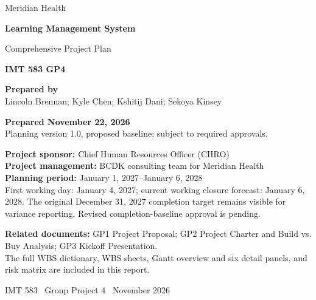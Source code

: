 \documentclass[11pt,letterpaper]{article}
\begin{document}
\thispagestyle{empty}
\vspace*{0.30in}

{\large\color{MeridianGray}Meridian Health\par}
\vspace{0.30in}
\begin{minipage}[t]{0.42\textwidth}
\RaggedRight
{\Huge\bfseries\color{MeridianPurple}Learning Management System\par}
\vspace{0.12in}
{\LARGE Comprehensive Project Plan\par}
\vspace{0.32in}

{\large\bfseries\color{MeridianPurple}IMT 583 GP4\par}
\vspace{0.20in}
\textbf{Prepared by}\\[4pt]
Lincoln Brennan; Kyle Chen; Kshitij Dani; Sekoya Kinsey

\vspace{0.20in}
\textbf{Prepared November 22, 2026}\\[6pt]
Planning version 1.0, proposed baseline; subject to required approvals.
\end{minipage}\hfill
\begin{minipage}[t]{0.53\textwidth}
\small
\RaggedRight
\textbf{Project sponsor:} Chief Human Resources Officer (CHRO)\\[6pt]
\textbf{Project management:} BCDK consulting team for Meridian Health\\[6pt]
\textbf{Planning period:} January 1, 2027--January 6, 2028\\
First working day: January 4, 2027; current working closure forecast:
January 6, 2028. The original December 31, 2027 completion target remains
visible for variance reporting. Revised completion-baseline approval is pending.

\vspace{0.15in}
\textbf{Related documents:} GP1 Project Proposal; GP2 Project Charter and
Build vs. Buy Analysis; GP3 Kickoff Presentation.\\[6pt]
The full WBS dictionary, WBS sheets, Gantt overview and six detail panels,
and risk matrix are included in this report.
\end{minipage}

\vfill
\begin{center}
{\small\color{MeridianGray}IMT 583 \textbar\ Group Project 4 \textbar\ November 2026}
\end{center}
\clearpage
\end{document}
